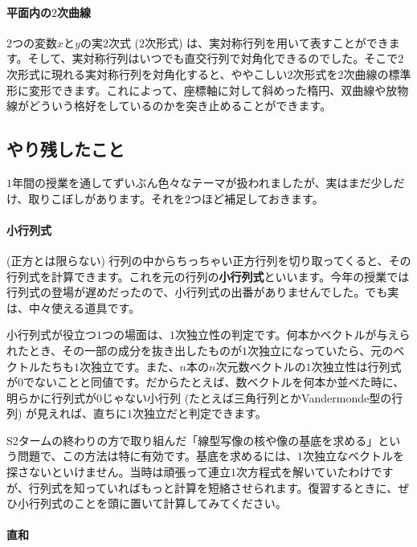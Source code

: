 \paragraph{平面内の$2$次曲線}

$2$つの変数$x$と$y$の実$2$次式 ($2$次形式) は、実対称行列を用いて表すことができます。そして、実対称行列はいつでも直交行列で対角化できるのでした。そこで$2$次形式に現れる実対称行列を対角化すると、ややこしい$2$次形式を$2$次曲線の標準形に変形できます。これによって、座標軸に対して斜めった楕円、双曲線や放物線がどういう格好をしているのかを突き止めることができます。

\subsection{やり残したこと}

$1$年間の授業を通してずいぶん色々なテーマが扱われましたが、実はまだ少しだけ、取りこぼしがあります。それを$2$つほど補足しておきます。

\paragraph{小行列式}

(正方とは限らない) 行列の中からちっちゃい正方行列を切り取ってくると、その行列式を計算できます。これを元の行列の\textbf{小行列式}といいます。今年の授業では行列式の登場が遅めだったので、小行列式の出番がありませんでした。でも実は、中々使える道具です。

小行列式が役立つ$1$つの場面は、$1$次独立性の判定です。何本かベクトルが与えられたとき、その一部の成分を抜き出したものが$1$次独立になっていたら、元のベクトルたちも$1$次独立です。また、$n$本の$n$次元数ベクトルの$1$次独立性は行列式が$0$でないことと同値です。だからたとえば、数ベクトルを何本か並べた時に、明らかに行列式が$0$じゃない小行列 (たとえば三角行列とかVandermonde型の行列) が見えれば、直ちに$1$次独立だと判定できます。

S2タームの終わりの方で取り組んだ「線型写像の核や像の基底を求める」という問題で、この方法は特に有効です。基底を求めるには、$1$次独立なベクトルを探さないといけません。当時は頑張って連立$1$次方程式を解いていたわけですが、行列式を知っていればもっと計算を短絡させられます。復習するときに、ぜひ小行列式のことを頭に置いて計算してみてください。

\paragraph{直和}

